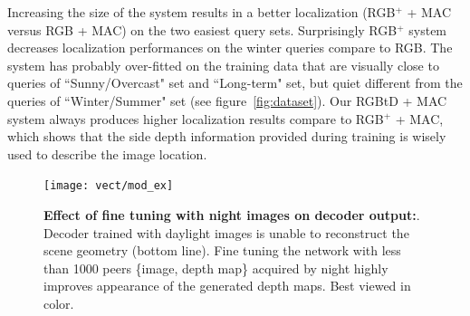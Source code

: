 

Increasing the size of the system results in a better localization (RGB$^{+}$ + MAC versus RGB + MAC) on the two easiest query sets. Surprisingly RGB$^{+}$ system decreases localization performances on the winter queries compare to RGB. The system has probably over-fitted on the training data that are visually close to queries of ``Sunny/Overcast" set and ``Long-term" set, but quiet different from the queries of ``Winter/Summer" set (see figure~\ref{fig:dataset}). Our RGBtD + MAC system always produces higher localization results compare to RGB$^{+}$ + MAC, which shows that the side depth information provided during training is wisely used to describe the image location. 

\begin{figure}
	\center
	\texttt{[image: vect/mod\_ex]}	
	\caption{\label{fig:mod_ex} \textbf{Effect of fine tuning with night images on decoder output:}. Decoder trained with daylight images is unable to reconstruct the scene geometry (bottom line). Fine tuning the network with less than 1000 peers \{image, depth map\} acquired by night highly improves appearance of the generated depth maps. Best viewed in color.}
\end{figure}

